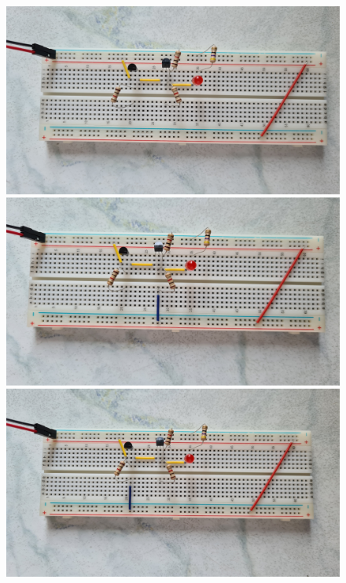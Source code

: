 \begin{figure}[h!]
	\begin{minipage}{.5\textwidth}
		\centering
		\includegraphics[scale=.05]{./Fotos/UND-00.jpg}
		\vspace{1cm}
	\end{minipage}%
	\begin{minipage}{.5\textwidth}
		\centering
		\includegraphics[scale=.05]{./Fotos/UND-01.jpg}
		\vspace{1cm}
	\end{minipage}
	\begin{minipage}{.5\textwidth}
		\centering
		\includegraphics[scale=.05]{./Fotos/UND-10.jpg}

\end{minipage}
\end{figure}
